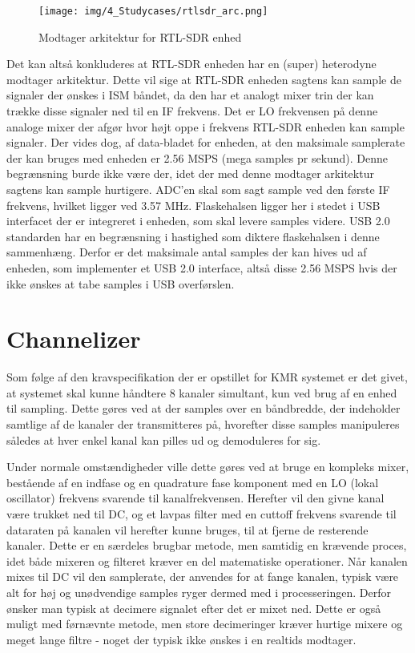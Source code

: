 \begin{appendices}
\begin{figure}[H]
	\centering{}
	\texttt{[image: img/4\_Studycases/rtlsdr\_arc.png]}
	\caption{Modtager arkitektur for RTL-SDR enhed}
	\label{fig:rtlsdr_arc}
\end{figure} 

Det kan altså konkluderes at RTL-SDR enheden har en (super) heterodyne modtager arkitektur. Dette vil sige at RTL-SDR enheden sagtens kan sample de signaler der ønskes i ISM båndet, da den har et analogt mixer trin der kan trække disse signaler ned til en IF frekvens. Det er LO frekvensen på denne analoge mixer der afgør hvor højt oppe i frekvens RTL-SDR enheden kan sample signaler. Der vides dog, af data-bladet for enheden, at den maksimale samplerate der kan bruges med enheden er 2.56 MSPS (mega samples pr sekund). Denne begrænsning burde ikke være der, idet der med denne modtager arkitektur sagtens kan sample hurtigere. ADC'en skal som sagt sample ved den første IF frekvens, hvilket ligger ved 3.57 MHz. Flaskehalsen ligger her i stedet i USB interfacet der er integreret i enheden, som skal levere samples videre. USB 2.0 standarden har en begrænsning i hastighed som diktere flaskehalsen i denne sammenhæng. Derfor er det maksimale antal samples der kan hives ud af enheden, som implementer et USB 2.0 interface, altså disse 2.56 MSPS hvis der ikke ønskes at tabe samples i USB overførslen.

\pagebreak

\section{Channelizer} \label{appendix::studycase::channelizer}
Som følge af den kravspecifikation der er opstillet for KMR systemet er det givet, at systemet skal kunne håndtere 8 kanaler simultant, kun ved brug af en enhed til sampling. Dette gøres ved at der samples over en båndbredde, der indeholder samtlige af de kanaler der transmitteres på, hvorefter disse samples manipuleres således at hver enkel kanal kan pilles ud og demoduleres for sig. 

Under normale omstændigheder ville dette gøres ved at bruge en kompleks mixer, bestående af en indfase og en quadrature fase komponent med en LO (lokal oscillator) frekvens svarende til kanalfrekvensen. Herefter vil den givne kanal være trukket ned til DC, og et lavpas filter med en cuttoff frekvens svarende til dataraten på kanalen vil herefter kunne bruges, til at fjerne de resterende kanaler. Dette er en særdeles brugbar metode, men samtidig en krævende proces, idet både mixeren og filteret kræver en del matematiske operationer. Når kanalen mixes til DC vil den samplerate, der anvendes for at fange kanalen, typisk være alt for høj og unødvendige samples ryger dermed med i processeringen. Derfor ønsker man typisk at decimere signalet efter det er mixet ned. Dette er også muligt med førnævnte metode, men store decimeringer kræver hurtige mixere og meget lange filtre - noget der typisk ikke ønskes i en realtids modtager. 


\end{appendices}
